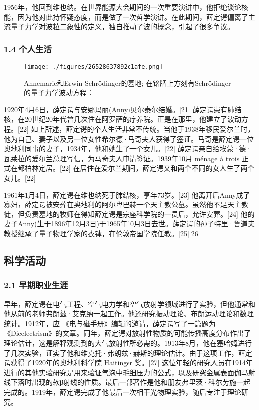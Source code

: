 1956年，他回到维也纳。在世界能源大会期间的一次重要演讲中，他拒绝谈论核能，因为他对此持怀疑态度，而是做了一次哲学演讲。在此期间，薛定谔偏离了主流量子力学对波粒二象性的定义，独自推动了波的概念，引起了很多争议。

\subsubsection{1.4 个人生活}
\begin{figure}[ht]
\centering
\texttt{[image: ./figures/26528637892c1afe.png]}
\caption{Annemarie和Erwin Schrödinger的墓地; 在铭牌上方刻有Schrödinger的量子力学波动方程：} \label{fig_Erwin_3}
\end{figure}
1920年4月6日，薛定谔与安娜玛丽(Anny)贝尔泰尔结婚。[21] 薛定谔患有肺结核，在20世纪20年代曾几次住在阿罗萨的疗养院。正是在那里，他建立了波动方程。[22] 如上所述，薛定谔的个人生活非常不传统。当他于1938年移民爱尔兰时，他为自己、妻子以及另一位女性希尔德·马奇夫人获得了签证。马奇是薛定谔一位奥地利同事的妻子，1934年，他和她生了一个女儿。[22] 薛定谔亲自给埃蒙·德·瓦莱拉的爱尔兰总理写信，为马奇夫人申请签证。1939年10月 ménage à trois 正式在都柏林定居。[22] 在居住在爱尔兰期间，薛定谔又和两个不同的女人生了两个女儿。[22]

1961年1月4日，薛定谔在维也纳死于肺结核，享年73岁。[23] 他离开后Anny成了寡妇，薛定谔被安葬在奥地利的阿尔卑巴赫一个天主教公墓。虽然他不是天主教徒，但负责墓地的牧师在得知薛定谔是宗座科学院的一员后，允许安葬。[24] 他的妻子Anny(生于1896年12月3日)于1965年10月3日去世。薛定谔的孙子特里·鲁道夫教授继承了量子物理学家的衣钵，在伦敦帝国学院任教。[25][26]

\subsection{科学活动}
\subsubsection{2.1 早期职业生涯}
早年，薛定谔在电气工程、空气电力学和空气放射学领域进行了实验，但他通常和他从前的老师弗朗兹·艾克纳一起工作。他还研究振动理论、布朗运动理论和数理统计。1912年，应 《电与磁手册》编辑的邀请，薛定谔写了一篇题为 《Dieelectrism》的文章。同年，薛定谔对放射性物质的可能传播高度分布作出了理论估计，这是解释观测到的大气放射性所必需的。1913年8月，他在塞哈姆进行了几次实验，证实了他和维克托·弗朗兹·赫斯的理论估计。由于这项工作，薛定谔获得了1920年的奥地利科学院 Haitinger 奖。[27] 这位年轻的研究人员在1914年进行的其他实验研究是用来验证气泡中毛细压力的公式，以及研究金属表面伽马射线下落时出现的软β射线的性质。最后一部著作是他和朋友弗里茨·科尔劳施一起完成的。1919年，薛定谔完成了他最后一次相干光物理实验，随后专注于理论研究。

